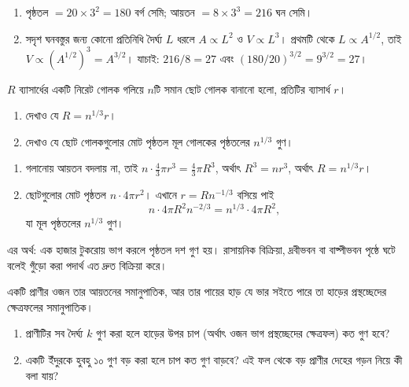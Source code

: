 \documentclass[11pt]{article}
\begin{document}
\begin{sol}
\begin{enumerate}
  \item পৃষ্ঠতল $= 20 \times 3^{2} = 180$ বর্গ সেমি; আয়তন
        $= 8 \times 3^{3} = 216$ ঘন সেমি।
  \item সদৃশ ঘনবস্তুর জন্য কোনো প্রতিনিধি দৈর্ঘ্য $L$ ধরলে $A \propto L^{2}$ ও
        $V \propto L^{3}$। প্রথমটি থেকে $L \propto A^{1/2}$, তাই
        $V \propto \left( A^{1/2} \right)^{3} = A^{3/2}$। যাচাই:
        $216/8 = 27$ এবং $(180/20)^{3/2} = 9^{3/2} = 27$।
\end{enumerate}
\end{sol}

 $R$ ব্যাসার্ধের একটি নিরেট গোলক গলিয়ে $n$টি সমান ছোট গোলক বানানো হলো,
প্রতিটির ব্যাসার্ধ $r$।
\begin{enumerate}
  \item দেখাও যে $R = n^{1/3} r$।
  \item দেখাও যে ছোট গোলকগুলোর মোট পৃষ্ঠতল মূল গোলকের পৃষ্ঠতলের $n^{1/3}$ গুণ।
\end{enumerate}

\begin{sol}
\begin{enumerate}
  \item গলানোয় আয়তন বদলায় না, তাই
        $n \cdot \tfrac{4}{3}\pi r^{3} = \tfrac{4}{3}\pi R^{3}$, অর্থাৎ
        $R^{3} = n r^{3}$, অর্থাৎ $R = n^{1/3} r$।
  \item ছোটগুলোর মোট পৃষ্ঠতল $n \cdot 4\pi r^{2}$। এখানে
        $r = R n^{-1/3}$ বসিয়ে পাই
        \[
          n \cdot 4\pi R^{2} n^{-2/3} = n^{1/3} \cdot 4\pi R^{2} ,
        \]
        যা মূল পৃষ্ঠতলের $n^{1/3}$ গুণ।
\end{enumerate}
এর অর্থ: এক হাজার টুকরোয় ভাগ করলে পৃষ্ঠতল দশ গুণ হয়। রাসায়নিক বিক্রিয়া,
দ্রবীভবন বা বাষ্পীভবন পৃষ্ঠে ঘটে বলেই গুঁড়ো করা পদার্থ এত দ্রুত বিক্রিয়া করে।
\end{sol}

 একটি প্রাণীর ওজন তার আয়তনের সমানুপাতিক, আর তার পায়ের হাড় যে ভার সইতে
পারে তা হাড়ের প্রস্থচ্ছেদের ক্ষেত্রফলের সমানুপাতিক।
\begin{enumerate}
  \item প্রাণীটির সব দৈর্ঘ্য $k$ গুণ করা হলে হাড়ের উপর চাপ (অর্থাৎ ওজন ভাগ
        প্রস্থচ্ছেদের ক্ষেত্রফল) কত গুণ হবে?
  \item একটি ইঁদুরকে হুবহু ১০ গুণ বড় করা হলে চাপ কত গুণ বাড়বে? এই ফল থেকে
        বড় প্রাণীর দেহের গড়ন নিয়ে কী বলা যায়?
\end{enumerate}
\end{document}
